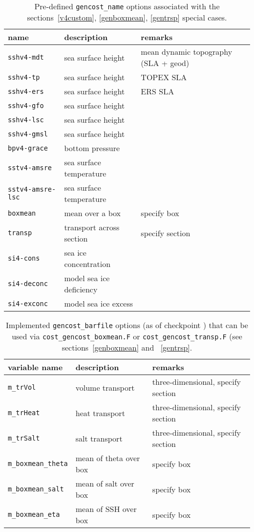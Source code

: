 \begin{table}[!ht]
\centering
\begin{tabular}{lll}
name						&	description					&	remarks \\ \hline\hline
\texttt{sshv4-mdt}			&	sea surface height			&	mean dynamic topography (SLA + geod) \\
\texttt{sshv4-tp}			&	sea surface height			&	TOPEX SLA \\
\texttt{sshv4-ers}			&	sea surface height			&	ERS SLA \\
\texttt{sshv4-gfo}			&	sea surface height			&	\\
\texttt{sshv4-lsc}			&	sea surface height			&	\\
\texttt{sshv4-gmsl}			&	sea surface height			&	\\
\texttt{bpv4-grace}			&	bottom pressure				&	\\
\texttt{sstv4-amsre}		&	sea surface temperature		&	\\
\texttt{sstv4-amsre-lsc}	&	sea surface temperature		&	\\ \hline
\texttt{boxmean}			&	mean over a box				&	specify box \\
\texttt{transp}				&	transport across section	&	specify section \\ \hline
\texttt{si4-cons}			&	sea ice concentration		& \\
\texttt{si4-deconc}			&	model sea ice deficiency	& \\
\texttt{si4-exconc}			&	model sea ice excess	& \\
\end{tabular}
\caption{Pre-defined \texttt{gencost\_name} options associated with the sections~\ref{v4custom}, \ref{genboxmean}, \ref{gentrsp} special cases.}
\label{tbl:gencost_ecco_name}
\end{table}

\begin{table}[!ht]
\centering
\begin{tabular}{lll}
variable name				&	description						&	remarks \\ \hline\hline
\texttt{m\_trVol}			&	volume transport				& three-dimensional, specify section \\ 
\texttt{m\_trHeat}			&	heat transport					& three-dimensional, specify section \\ 
\texttt{m\_trSalt}			&	salt transport					& three-dimensional, specify section \\ 
\texttt{m\_boxmean\_theta}	&	mean of theta over box			& specify box \\
\texttt{m\_boxmean\_salt}	&	mean of salt over box			& specify box \\
\texttt{m\_boxmean\_eta}	&	mean of SSH over box			& specify box 
\end{tabular}
\caption{Implemented \texttt{gencost\_barfile} options (as of checkpoint \mitgcmCheckpointVersion) that can be used via \texttt{cost\_gencost\_boxmean.F} or \texttt{cost\_gencost\_transp.F} (see sections~\ref{genboxmean} and ~\ref{gentrsp}.}
\label{tbl:gencost_ecco_barfile_custom}
\end{table}



